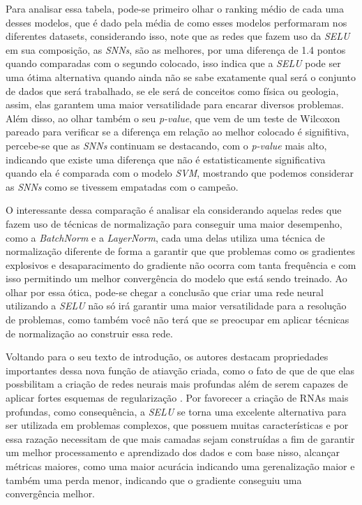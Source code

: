 Para analisar essa tabela, pode-se primeiro olhar o ranking médio de cada uma desses modelos, que é dado pela média de como esses modelos performaram nos diferentes datasets, considerando isso, note que as redes que fazem uso da \textit{SELU} em sua composição, as \textit{SNNs}, são as melhores, por uma diferença de 1.4 pontos quando comparadas com o segundo colocado, isso indica que a \textit{SELU} pode ser uma ótima alternativa quando ainda não se sabe exatamente qual será o conjunto de dados que será trabalhado, se ele será de conceitos como física ou geologia, assim, elas garantem uma maior versatilidade para encarar diversos problemas. Além disso, ao olhar também o seu \textit{p-value}, que vem de um teste de Wilcoxon pareado para verificar se a diferença em relação ao melhor colocado é signifitiva, percebe-se que as \textit{SNNs} continuam se destacando, com o \textit{p-value} mais alto, indicando que existe uma diferença que não é estatisticamente significativa quando ela é comparada com o modelo \textit{SVM}, mostrando que podemos considerar as \textit{SNNs} como se tivessem empatadas com o campeão.

O interessante dessa comparação é analisar ela considerando aquelas redes que fazem uso de técnicas de normalização para conseguir uma maior desempenho, como a \textit{BatchNorm} e a \textit{LayerNorm}, cada uma delas utiliza uma técnica de normalização diferente de forma a garantir que que problemas como os gradientes explosivos e desaparacimento do gradiente não ocorra com tanta frequência e com isso permitindo um melhor convergência do modelo que está sendo treinado. Ao olhar por essa ótica, pode-se chegar a conclusão que criar uma rede neural utilizando a \textit{SELU} não só irá garantir uma maior versatilidade para a resolução de problemas, como também você não terá que se preocupar em aplicar técnicas de normalização ao construir essa rede.

Voltando para o seu texto de introdução, os autores destacam propriedades importantes dessa nova função de atiavção criada, como o fato de que de que elas possbilitam a criação de redes neurais mais profundas além de serem capazes de aplicar fortes esquemas de regularização \parencite{SELUArticle}. Por favorecer a criação de RNAs mais profundas, como consequência, a \textit{SELU} se torna uma excelente alternativa para ser utilizada em problemas complexos, que possuem muitas características e por essa razação necessitam de que mais camadas sejam construídas a fim de garantir um melhor processamento e aprendizado dos dados e com base nisso, alcançar métricas maiores, como uma maior acurácia indicando uma gerenalização maior e também uma perda menor, indicando que o gradiente conseguiu uma convergência melhor.

